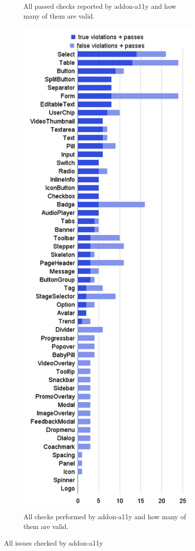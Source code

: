 \documentclass{master_thesis}
\begin{document}
\begin{figure}[H]
\begin{subfigure}{0.34\textwidth}
	\caption{All passed checks reported by addon-a11y and how many of them are valid.}
	\label{fig:audit-passed}
	\end{subfigure}
	\begin{subfigure}{0.39\textwidth}
	\includegraphics[height=0.7\textheight]{img/audit-all.png}
	\caption{All checks performed by addon-a11y and how many of them are valid.}
	\label{fig:audit-all}
	\end{subfigure}
\caption{All issues checked by addon-a11y}
\label{fig:audit-passed-failed}
\end{figure}
\end{document}
